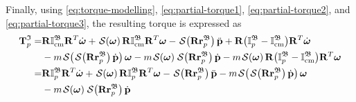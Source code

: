 Finally, using \eqref{eq:torque-modelling}, \eqref{eq:partial-torque1}, \eqref{eq:partial-torque2}, and \eqref{eq:partial-torque3}, the resulting torque is expressed as
\begin{align}
    \mathbf{T}^\mathfrak{I}_p = &\mathbf{R}\mathbb{I}^\mathfrak{B}_\text{cm}\mathbf{R}^T\dot{\boldsymbol{\omega}} + \SL[\boldsymbol{\omega}]\mathbf{R}\mathbb{I}^\mathfrak{B}_\text{cm}\mathbf{R}^T\boldsymbol{\omega} - \SL[\mathbf{R}\mathbf{r}^\mathfrak{B}_p]\ddot{\mathbf{p}} + \mathbf{R}\bigl(\mathbb{I}^\mathfrak{B}_p - \mathbb{I}^\mathfrak{B}_\text{cm}\bigr)\mathbf{R}^T\dot{\boldsymbol{\omega}} \\
    &-m\SL[\SL[\mathbf{R}\mathbf{r}_p^\mathfrak{B}]\dot{\mathbf{p}}]\boldsymbol{\omega}
    -m\SL[\boldsymbol{\omega}]\SL[\mathbf{R}\mathbf{r}_p^\mathfrak{B}]\dot{\mathbf{p}}
    - m\SL[\boldsymbol{\omega}]\mathbf{R}\bigl(\mathbb{I}^\mathfrak{B}_p-\mathbb{I}^\mathfrak{B}_\text{cm}\bigr)\mathbf{R}^T\boldsymbol{\omega}\\
    = &\mathbf{R}\mathbb{I}^\mathfrak{B}_p\mathbf{R}^T\dot{\boldsymbol{\omega}} + \SL[\boldsymbol{\omega}]\mathbf{R}\mathbb{I}^\mathfrak{B}_p\mathbf{R}^T\boldsymbol{\omega} - \SL[\mathbf{R}\mathbf{r}^\mathfrak{B}_p]\ddot{\mathbf{p}} -m\SL[\SL[\mathbf{R}\mathbf{r}_p^\mathfrak{B}]\dot{\mathbf{p}}]\boldsymbol{\omega}\\
    &-m\SL[\boldsymbol{\omega}]\SL[\mathbf{R}\mathbf{r}_p^\mathfrak{B}]\dot{\mathbf{p}}
\end{align}

